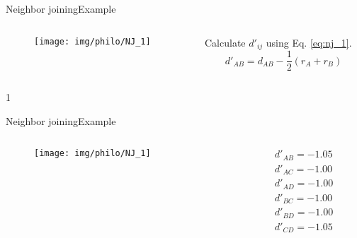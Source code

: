 \documentclass[10pt]{beamer}
\def\mysol{0}
\def\mysol{1}
\newcommand{\1}{
	\setbeamertemplate{background}{
		\texttt{[image: img/1]}
		\tikz[overlay] \fill[fill opacity=0.75,fill=white] (0,0) rectangle (-\paperwidth,\paperheight);
	}
}
\begin{document}
\begin{frame}{Neighbor joining}{Example}
	\begin{columns}
		\begin{column}{0.48\textwidth}
			\begin{figure}
				\texttt{[image: img/philo/NJ\_1]}
			\end{figure}
		\end{column}
		\begin{column}{0.48\textwidth}
			Calculate $d'_{ij}$ using Eq. \ref{eq:nj_1}.	
			\begin{equation*}
				d'_{AB} = d_{AB} - \frac{1}{2}(r_A + r_B)
			\end{equation*} 
			
		\end{column}
	\end{columns}
\end{frame}

\if\mysol1
\begin{frame}{Neighbor joining}{Example}
	\begin{columns}
		\begin{column}{0.48\textwidth}
			\begin{figure}
				\texttt{[image: img/philo/NJ\_1]}
			\end{figure}
		\end{column}
		\begin{column}{0.48\textwidth}
			\begin{equation*}
			\begin{split}
				d'_{AB} = -1.05 \\
				d'_{AC} = -1.00 \\
				d'_{AD} = -1.00 \\
				d'_{BC} = -1.00 \\
				d'_{BD} = -1.00 \\
				d'_{CD} = -1.05 \\
			\end{split}
			\end{equation*} 			
		\end{column}
	\end{columns}
\end{frame}
\fi
\end{document}
